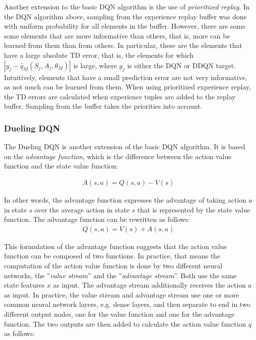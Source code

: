 Another extension to the basic DQN algorithm is the use of \emph{prioritized replay}. In the DQN algorithm above, sampling from the experience replay buffer was done with uniform probability for all elements in the buffer. However, there are some some elements that are more informative than others, that is, more can be learned from them than from others. In particular, these are the elements that have a large absolute TD error, that is, the elements for which $|y_j - \hat{q}_M (S_j, A_j, \theta_M)|$ is large, where $y_j$ is either the DQN or DDQN target. Intuitively, elements that have a small prediction error are not very informative, as not much can be learned from them. When using prioritized experience replay, the TD errors are calculated when experience tuples are added to the replay buffer. Sampling from the buffer takes the priorities into account. 

\subsubsection*{Dueling DQN}

The Dueling DQN is another extension of the basic DQN algorithm. It is based on the \emph{advantage function}, which is the difference between the action value function and the state value function:


\begin{align}
A(s, a) = Q(s, a) - V(s) \label{eq:advantage}
\end{align}

In other words, the advantage function expresses the advantage of taking action $a$ in state $s$ over the average action in state $s$ that is represented by the state value function. The advantage function can be rewritten as follows:
\begin{align*}
Q(s, a) = V(s) + A(s, a)
\end{align*}

This formulation of the advantage function suggests that the action value function can be composed of two functions. In practice, that means the computation of the action value function is done by two different neural networks, the ''\emph{value stream}'' and the ''\emph{advantage stream}''. Both use the same state features $x$ as input. The advantage stream additionally receives the action $a$ as input. In practice, the value stream and advantage stream use one or more common neural network layers, e.g. dense layers, and then separate to end in two different output nodes, one for the value function and one for the advantage function. The two outputs are then added to calculate the action value function $q$ as follows:

